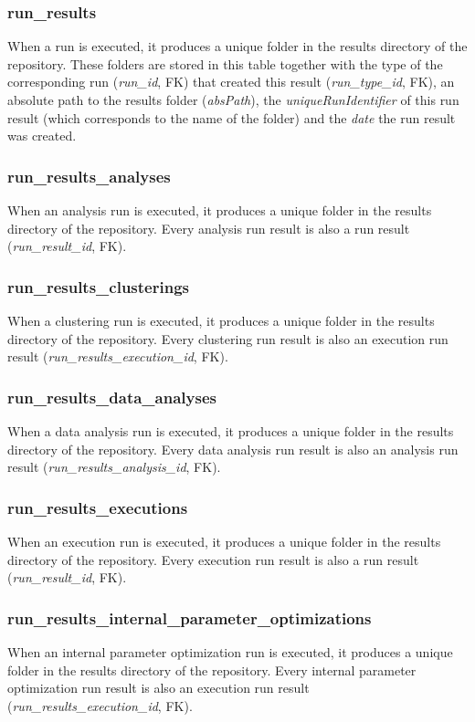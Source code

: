 	\subsubsection{run\_results}
	When a run is executed, it produces a unique folder in the results directory of the repository. These folders are stored in this table together with the type of the corresponding run (\textit{run\_id}, FK) that created this result (\textit{run\_type\_id}, FK), an absolute path to the results folder (\textit{absPath}), the \textit{uniqueRunIdentifier} of this run result (which corresponds to the name of the folder) and the \textit{date} the run result was created.
	
	\subsubsection{run\_results\_analyses}
	When an analysis run is executed, it produces a unique folder in the results directory of the repository. Every analysis run result is also a run result (\textit{run\_result\_id}, FK).
	
	\subsubsection{run\_results\_clusterings}
	When a clustering run is executed, it produces a unique folder in the results directory of the repository. Every clustering run result is also an execution run result (\textit{run\_results\_execution\_id}, FK).
	
	\subsubsection{run\_results\_data\_analyses}
	When a data analysis run is executed, it produces a unique folder in the results directory of the repository. Every data analysis run result is also an analysis run result (\textit{run\_results\_analysis\_id}, FK).
	
	\subsubsection{run\_results\_executions}
	When an execution run is executed, it produces a unique folder in the results directory of the repository. Every execution run result is also a run result (\textit{run\_result\_id}, FK).
	
	\subsubsection{run\_results\_internal\_parameter\_optimizations}
	When an internal parameter optimization run is executed, it produces a unique folder in the results directory of the repository. Every internal parameter optimization run result is also an execution run result (\textit{run\_results\_execution\_id}, FK).
	
